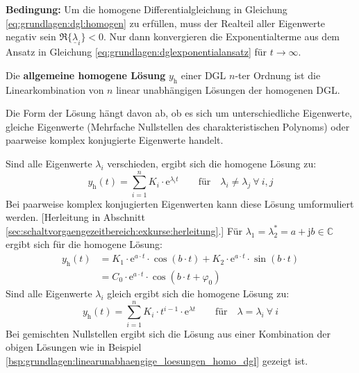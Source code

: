 \begin{frame}
{    %
    \textbf{Bedingung:} Um die homogene Differentialgleichung in Gleichung \ref{eq:grundlagen:dgl:homogen} 
    zu erfüllen, muss der Realteil aller Eigenwerte negativ sein $\Re\{\underline{\lambda}_i\}<0$. 
    Nur dann konvergieren die Exponentialterme aus dem Ansatz in Gleichung \ref{eq:grundlagen:dglexponentialansatz}
    für $t \to \infty$.

    Die \textbf{allgemeine homogene Lösung} $y_{\mathrm{h}}$ einer DGL $n$-ter Ordnung ist die Linearkombination
    von $n$ linear unabhängigen Lösungen der homogenen DGL.

    Die Form der Lösung hängt davon ab, ob es sich um unterschiedliche Eigenwerte, gleiche Eigenwerte (Mehrfache Nullstellen des charakteristischen Polynoms) 
    oder paarweise komplex konjugierte Eigenwerte handelt.

    Sind alle Eigenwerte $\lambda_i$ verschieden, ergibt sich die homogene Lösung zu:
    \begin{equation}\label{eq:grundlagen:homogeneloesung:lambdaungleich}
        y_{\mathrm{h}}(t) = \sum_{i=1}^{n} K_i \cdot \mathrm{e}^{\lambda_i t} \qquad \text{für} \quad \lambda_i \neq \lambda_j \ \forall \ i,j
    \end{equation}
    Bei paarweise komplex konjugierten Eigenwerten kann diese Lösung umformuliert werden. [Herleitung in Abschnitt \ref{sec:schaltvorgaengezeitbereich:exkurse:herleitung}.]
    Für $\lambda_1 = \lambda_2^* = a + \mathrm{j} b \in \mathbb{C}$ ergibt sich für die homogene Lösung:
    \begin{equation}\label{eq:grundlagen:homogeneloesung:lambdakomplex}
        \begin{aligned}
        y_{\mathrm{h}}(t) &= K_1 \cdot \mathrm{e}^{a \cdot t} \cdot \cos(b \cdot t) + K_2 \cdot \mathrm{e}^{a \cdot t} \cdot \sin(b \cdot t) \\
        &= C_0 \cdot \mathrm{e}^{a \cdot t} \cdot \cos(b \cdot t + \varphi_0)
        \end{aligned}
    \end{equation}
    Sind alle Eigenwerte $\lambda_i$ gleich ergibt sich die homogene Lösung zu:
    \begin{equation}\label{eq:grundlagen:homogeneloesung:lambdagleich}
        y_{\mathrm{h}}(t) = \sum_{i=1}^{n} K_i \cdot t^{i-1}  \cdot \mathrm{e}^{\lambda t} \qquad \text{für} \quad \lambda = \lambda_i \ \forall \ i
    \end{equation}
    Bei gemischten Nullstellen ergibt sich die Lösung aus einer Kombination der obigen Lösungen wie in
    Beispiel \ref{bsp:grundlagen:linearunabhaengige_loesungen_homo_dgl} gezeigt ist.

}
\end{frame}
